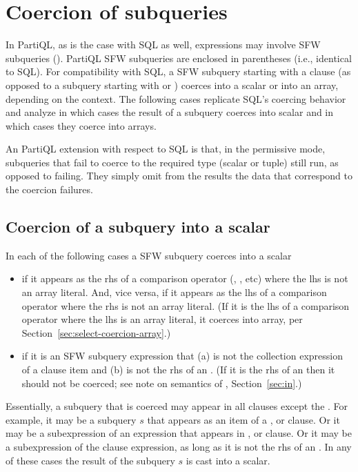 \section{Coercion of subqueries} 
\label{sec:subquery-coercion}

In PartiQL, as is the case with SQL as well, expressions may involve SFW
subqueries (). PartiQL SFW subqueries are enclosed in
parentheses (i.e., identical to SQL). For compatibility with SQL, a SFW subquery
starting with a  clause (as opposed to a subquery starting with
 or ) coerces into a scalar or into an array,
depending on the context. The following cases replicate SQL's coercing behavior
and analyze in which cases the result of a subquery coerces into scalar and in
which cases they coerce into arrays.

An PartiQL extension with respect to SQL is that, in the permissive mode,
subqueries that fail to coerce to the required type (scalar or tuple) still run,
as opposed to failing. They simply omit from the results the data that
correspond to the coercion failures.

\subsection{Coercion of a  subquery into a scalar}
\label{sec:select-coercion-scalar}
In each of the following cases a SFW subquery coerces into a scalar
\begin{itemize}
\item if it appears as the rhs of a comparison operator (\gt{=}, \gt{>}, etc)
where the lhs is not an array literal. And, vice versa, if it appears as the lhs
of a comparison operator where the rhs is not an array literal. (If it is the
lhs of a comparison operator where the lhs is an array literal, it coerces into
array, per Section~\ref{sec:select-coercion-array}.)
\item if it is an SFW subquery expression that (a) is not the collection
expression of a  clause item and (b) is not the rhs of an . (If
it is the rhs of an  then it should not be coerced; see note on semantics
of , Section~\ref{sec:in}.)
\end{itemize}

Essentially, a subquery that is coerced may appear in all clauses except the
. For example, it may be a  subquery $s$ that appears as an
item of a ,  or  clause. Or it may
be a subexpression of an expression that appears in ,  or  clause. Or it may be a subexpression of the
 clause expression, as long as it is not the rhs of an . In any
of these cases the result of the subquery $s$ is cast into a scalar. 


